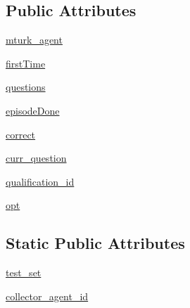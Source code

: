 \subsection*{Public Attributes}
\begin{DoxyCompactItemize}
\item 
\hyperlink{classparlai_1_1mturk_1_1tasks_1_1qualification__flow__example_1_1worlds_1_1QualificationFlowSoloWorld_a3adec199df30efa7c83a6d92de25b1c1}{mturk\+\_\+agent}
\item 
\hyperlink{classparlai_1_1mturk_1_1tasks_1_1qualification__flow__example_1_1worlds_1_1QualificationFlowSoloWorld_a8078da8a5070aeb6a71f5fb04ce8a48e}{first\+Time}
\item 
\hyperlink{classparlai_1_1mturk_1_1tasks_1_1qualification__flow__example_1_1worlds_1_1QualificationFlowSoloWorld_a0b1d8548a0a7927253169f2ca0603526}{questions}
\item 
\hyperlink{classparlai_1_1mturk_1_1tasks_1_1qualification__flow__example_1_1worlds_1_1QualificationFlowSoloWorld_a1264fae93c78bc48bdba79d0fee88e2b}{episode\+Done}
\item 
\hyperlink{classparlai_1_1mturk_1_1tasks_1_1qualification__flow__example_1_1worlds_1_1QualificationFlowSoloWorld_a2c6f4ecd7fd17c4d16d7074816562656}{correct}
\item 
\hyperlink{classparlai_1_1mturk_1_1tasks_1_1qualification__flow__example_1_1worlds_1_1QualificationFlowSoloWorld_ae93e005831e10fa1bb215a8565a2d7d7}{curr\+\_\+question}
\item 
\hyperlink{classparlai_1_1mturk_1_1tasks_1_1qualification__flow__example_1_1worlds_1_1QualificationFlowSoloWorld_a201c886bc3659ba6f4a59c6ea568b6f6}{qualification\+\_\+id}
\item 
\hyperlink{classparlai_1_1mturk_1_1tasks_1_1qualification__flow__example_1_1worlds_1_1QualificationFlowSoloWorld_aca37e756d5c9ef6ae9031b42ccc1ab75}{opt}
\end{DoxyCompactItemize}
\subsection*{Static Public Attributes}
\begin{DoxyCompactItemize}
\item 
\hyperlink{classparlai_1_1mturk_1_1tasks_1_1qualification__flow__example_1_1worlds_1_1QualificationFlowSoloWorld_a255e673bf9502097ffcb79fd26191d37}{test\+\_\+set}
\item 
\hyperlink{classparlai_1_1mturk_1_1tasks_1_1qualification__flow__example_1_1worlds_1_1QualificationFlowSoloWorld_a7f5156373be56e174904dc53487f122d}{collector\+\_\+agent\+\_\+id}
\end{DoxyCompactItemize}


